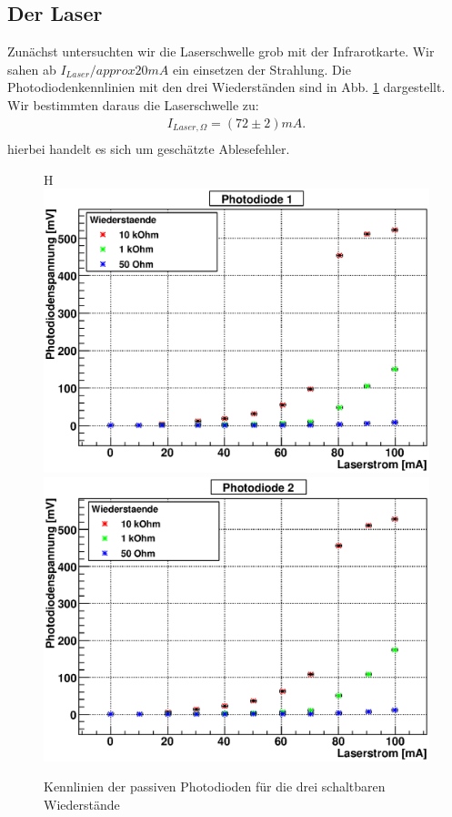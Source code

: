 \documentclass[12pt]{article}
\begin{document}
\subsection{Der Laser}
Zunächst untersuchten wir die Laserschwelle grob mit der Infrarotkarte. Wir sahen ab $I_{Laser} /approx 20 mA$ ein einsetzen der Strahlung.
Die Photodiodenkennlinien mit den drei Wiederständen sind in Abb. \ref{pdkennlinien} dargestellt. Wir bestimmten daraus die Laserschwelle zu:
\begin{align*}
 I_{Laser, \Omega} = (72 \pm 2) mA. \\
\end{align*}
hierbei handelt es sich um geschätzte Ablesefehler.
\begin{figure}H
 \includegraphics[width=0.9\linewidth]{pictures/pd_kenn1.eps}
 \includegraphics[width=0.9\linewidth]{pictures/pd_kenn2.eps}
 \caption{Kennlinien der passiven Photodioden für die drei schaltbaren Wiederstände}
 \label{pdkennlinien}
\end{figure}
\end{document}
